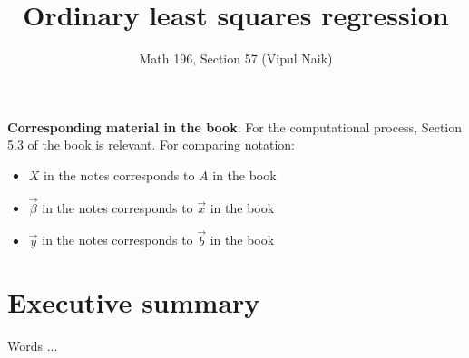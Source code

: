 \documentclass[10pt]{amsart}
\title{Ordinary least squares regression}
\author{Math 196, Section 57 (Vipul Naik)}
\begin{document}
\maketitle

{\bf Corresponding material in the book}: For the computational
process, Section 5.3 of the book is relevant. For comparing notation:

\begin{itemize}
\item $X$ in the notes corresponds to $A$ in the book
\item $\vec{\beta}$ in the notes corresponds to $\vec{x}$ in the book
\item $\vec{y}$ in the notes corresponds to $\vec{b}$ in the book
\end{itemize}

\section*{Executive summary}

Words ...
\end{document}

